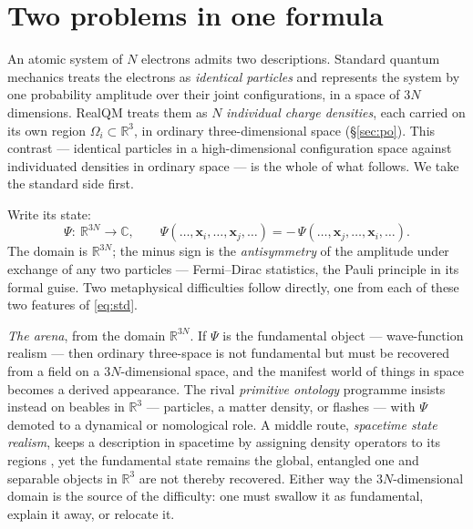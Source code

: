 \documentclass[11pt]{article}
\begin{document}
\section{Two problems in one formula}
\label{sec:two}

An atomic system of $N$ electrons admits two descriptions. Standard quantum mechanics treats the electrons
as \emph{identical particles} and represents the system by one probability amplitude over their joint
configurations, in a space of $3N$ dimensions. RealQM \cite{RealQM} treats them as $N$ \emph{individual
charge densities}, each carried on its own region $\Omega_i\subset\mathbb R^3$, in ordinary
three-dimensional space (\S\ref{sec:po}). This contrast --- identical particles in a high-dimensional
configuration space against individuated densities in ordinary space --- is the whole of what follows. We
take the standard side first.

Write its state:
\begin{equation}
\Psi:\ \mathbb R^{3N}\to\mathbb C,\qquad
\Psi(\dots,\mathbf x_i,\dots,\mathbf x_j,\dots)=-\,\Psi(\dots,\mathbf x_j,\dots,\mathbf x_i,\dots).
\label{eq:std}
\end{equation}
The domain is $\mathbb R^{3N}$; the minus sign is the \emph{antisymmetry} of the amplitude under exchange of
any two particles --- Fermi--Dirac statistics, the Pauli principle in its formal guise. Two metaphysical
difficulties follow directly, one from each of these two features of \eqref{eq:std}.

\emph{The arena}, from the domain $\mathbb R^{3N}$. If $\Psi$ is the fundamental object --- wave-function
realism \cite{Albert1996,NeyAlbert2013,Ney2021} --- then ordinary three-space is not fundamental but must
be recovered from a field on a $3N$-dimensional space, and the manifest world of things in space becomes a
derived appearance. The rival \emph{primitive ontology} programme \cite{Maudlin2007,Allori2013,DGZ1992,Esfeld2014}
insists instead on beables in $\mathbb R^3$ --- particles, a matter density, or flashes --- with $\Psi$
demoted to a dynamical or nomological role. A middle route, \emph{spacetime state realism}, keeps a
description in spacetime by assigning density operators to its regions \cite{WallaceTimpson2010}, yet the
fundamental state remains the global, entangled one and separable objects in $\mathbb R^3$ are not thereby
recovered. Either way the $3N$-dimensional domain is the source of the difficulty: one must swallow it as
fundamental, explain it away, or relocate it.
\end{document}
